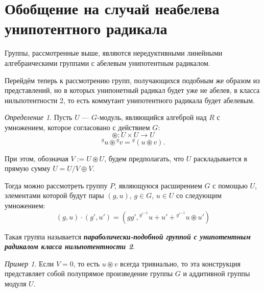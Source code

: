 \documentclass[10pt]{article}
\theoremstyle{break}
\theoremstyle{remark}
\newtheorem{example}{Пример}
\newtheorem{definition}{Определение}
\begin{document}
\section*{Обобщение на случай неабелева унипотентного радикала}

Группы, рассмотренные выше, являются нередуктивными линейными алгебраическими группами с абелевым унипотентным радикалом.

Перейдём теперь к рассмотрению групп, получающихся подобным же образом из представлений, но в которых унипонетный радикал будет уже не абелев, в класса нильпотентности 2, то есть коммутант унипотентного радикала будет абелевым.

\begin{tcolorbox}[colback=white]
\begin{definition}
Пусть $U$ --- $G$-модуль, являющийся алгеброй над $R$ с умножением, которое согласовано с действием $G$:
$$\circledast : U \times U \to U$$
$$ {}^g u \circledast {}^g v = {}^g (u \circledast v) .$$

При этом, обозначая $V:=U\circledast U$, будем предполагать, что $U$ раскладывается в прямую сумму $U = U/V \oplus V$.

Тогда можно рассмотреть группу $P$, являющуюся расширением $G$ с помощью $U$, элементами которой будут пары $(g,u)$, $g \in G$, $u \in U$ со следующим умножением:
$$
(g,u)\cdot (g',u') = (g g', {}^{g'^{-1}} u + u' + {}^{g'^{-1}} u \circledast u')
$$

Такая группа называется \textit{\textbf{параболически-подобной группой с унипотентным радикалом класса нильпотентности 2}}.
\end{definition}
\end{tcolorbox}

\begin{tcolorbox}[colback=white]
\begin{example}
Если $V=0$, то есть $u \circledast v$ всегда тривиально, то эта конструкция представляет собой полупрямое произведение группы $G$ и аддитивной группы модуля $U$.
\end{example}
\end{tcolorbox}
\end{document}
